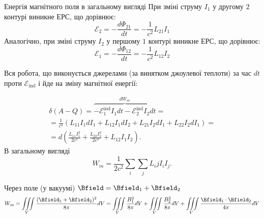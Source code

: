 \documentclass{beamer}
\begin{document}
\begin{frame}{Енергія магнітного поля в загальному вигляді}{}\small
       При зміні струму $ I_1 $ у другому $ 2 $ контурі виникне ЕРС, що дорівнює:
       \begin{equation*}
           \mathcal{E}_2 = -\frac{d\Phi_{21}}{dt} = -\frac1{c^2} L_{21}I_1
       \end{equation*}
      Аналогічно, при зміні струму $ I_2 $ у першому $ 1 $ контурі виникне ЕРС, що дорівнює:
      \begin{equation*}
          \mathcal{E}_1 = -\frac{d\Phi_{12}}{dt} = -\frac1{c^2} L_{12}I_2
      \end{equation*}

     Вся робота, що виконується джерелами (за винятком джоулевої теплоти) за час $ dt $ проти   $ \mathcal{E}_\text{ind} $ і йде на зміну магнітної енергії:

\begin{overprint}
     \begin{multline*}
     \delta (A - Q) = \overbrace{- \mathcal{E}^\text{ind}_1 I_1 dt -  \mathcal{E}^\text{ind}_2 I_2 dt}^{dW_m} =  \\
      = \frac1{c^2} (L_{11} I_1 dI_1 + L_{12} I_1 dI_2 +  L_{21} I_2 dI_1 + L_{22} I_2 dI_1 ) = \\
      = d \left(  \frac{L_{11} I_1^2}{2c^2} + \frac{L_{22} I_2^2}{2c^2} + L_{12} I_1I_2\right) .
     \end{multline*}
     В загальному вигляді
     \begin{equation*}
     W_m = \frac{1}{2c^2}\sum\limits_i\sum\limits_j L_ij I_i I_j.
     \end{equation*}

     Через поле (у вакуумі) $ \Bfield = \Bfield_1 + \Bfield_2 $
     \begin{equation*}
     W_m = \iiint\limits_V \frac{(\Bfield_1 + \Bfield_2)^2}{8\pi} dV = \iiint\limits_V \frac{B_1^2}{8\pi} dV + \iiint\limits_V \frac{B_2^2}{8\pi} dV + \iiint\limits_V \frac{\Bfield_1\cdot\Bfield_2}{4\pi} dV
     \end{equation*}
\end{overprint}

\end{frame}
\end{document}
